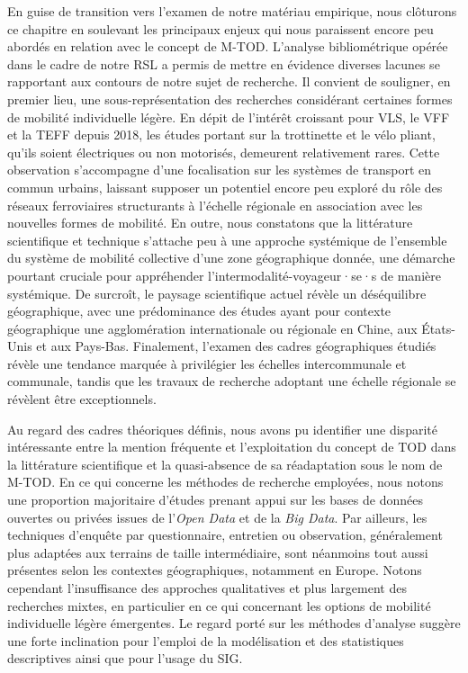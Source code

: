 \begin{refsegment}
En guise de transition vers l'examen de notre matériau empirique, nous clôturons ce chapitre en soulevant les principaux enjeux qui nous paraissent encore peu abordés en relation avec le concept de \acrshort{M-TOD}. L'analyse bibliométrique opérée dans le cadre de notre \acrshort{RSL} a permis de mettre en évidence diverses lacunes se rapportant aux contours de notre sujet de recherche. Il convient de souligner, en premier lieu, une sous-représentation des recherches considérant certaines formes de mobilité individuelle légère. En dépit de l'intérêt croissant pour \acrshort{VLS}, le \acrshort{VFF} et la \acrshort{TEFF} depuis 2018, les études portant sur la trottinette et le vélo pliant, qu'ils soient électriques ou non motorisés, demeurent relativement rares. Cette observation s'accompagne d'une focalisation sur les systèmes de transport en commun urbains, laissant supposer un potentiel encore peu exploré du rôle des réseaux ferroviaires structurants à l'échelle régionale en association avec les nouvelles formes de mobilité. En outre, nous constatons que la littérature scientifique et technique s'attache peu à une approche systémique de l'ensemble du système de mobilité collective d'une zone géographique donnée, une démarche pourtant cruciale pour appréhender l'intermodalité-voyageur·se·s de manière systémique. De surcroît, le paysage scientifique actuel révèle un déséquilibre géographique, avec une prédominance des études ayant pour contexte géographique une agglomération internationale ou régionale en Chine, aux États-Unis et aux Pays-Bas. Finalement, l'examen des cadres géographiques étudiés révèle une tendance marquée à privilégier les échelles intercommunale et communale, tandis que les travaux de recherche adoptant une échelle régionale se révèlent être exceptionnels.%

Au regard des cadres théoriques définis, nous avons pu identifier une disparité intéressante entre la mention fréquente et l'exploitation du concept de \acrshort{TOD} dans la littérature scientifique et la quasi-absence de sa réadaptation sous le nom de \acrshort{M-TOD}. En ce qui concerne les méthodes de recherche employées, nous notons une proportion majoritaire d'études prenant appui sur les bases de données ouvertes ou privées issues de l'\textsl{Open Data} et de la \textsl{Big Data}. Par ailleurs, les techniques d'enquête par questionnaire, entretien ou observation, généralement plus adaptées aux terrains de taille intermédiaire, sont néanmoins tout aussi présentes selon les contextes géographiques, notamment en Europe. Notons cependant l'insuffisance des approches qualitatives et plus largement des recherches mixtes, en particulier en ce qui concernant les options de mobilité individuelle légère émergentes. Le regard porté sur les méthodes d'analyse suggère une forte inclination pour l'emploi de la modélisation et des statistiques descriptives ainsi que pour l'usage du \acrshort{SIG}.%


\end{refsegment}
